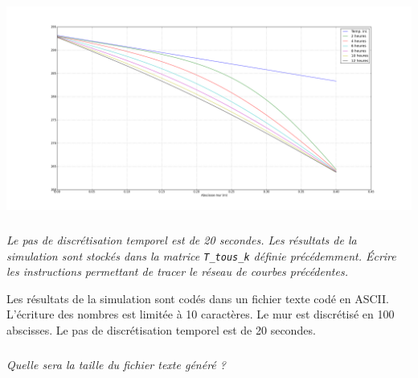 \documentclass[10pt,fleqn]{article} %
\begin{document}
\begin{center}
\includegraphics[width=\linewidth]{images/figure_04}
\end{center}

\subparagraph{}
\textit{Le pas de discrétisation temporel est de 20 secondes. Les résultats de la simulation sont stockés dans la matrice  \texttt{T\_tous\_k}  définie précédemment. Écrire les instructions permettant de tracer le réseau de courbes précédentes.}
\ifprof

\begin{corrige}
\end{corrige}
\else
\fi

Les résultats de la simulation sont codés dans un fichier texte codé en ASCII. L'écriture des nombres est limitée à 10 caractères. 
Le mur est discrétisé en 100 abscisses. Le pas de discrétisation temporel est de 20 secondes. 

\subparagraph{}
\textit{Quelle sera la taille du fichier texte généré ?}
\ifprof

\begin{corrige}
\end{corrige}
\else
\fi
\end{document}
